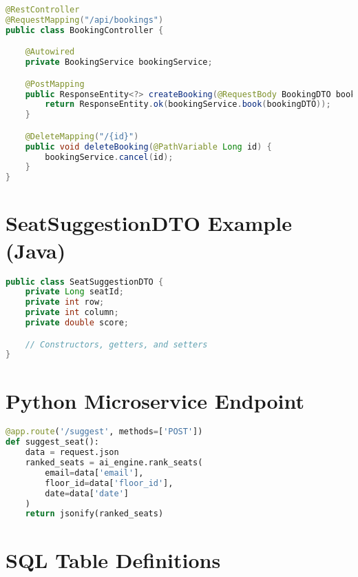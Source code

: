 \documentclass[12pt,a4paper]{report}
\begin{document}
\begin{lstlisting}[language=Java, caption=Booking Controller (Java), label=lst:booking-controller]
@RestController
@RequestMapping("/api/bookings")
public class BookingController {

    @Autowired
    private BookingService bookingService;

    @PostMapping
    public ResponseEntity<?> createBooking(@RequestBody BookingDTO bookingDTO) {
        return ResponseEntity.ok(bookingService.book(bookingDTO));
    }

    @DeleteMapping("/{id}")
    public void deleteBooking(@PathVariable Long id) {
        bookingService.cancel(id);
    }
}
\end{lstlisting}

\chapter{SeatSuggestionDTO Example (Java)}
\label{appendix:seatdto}

\begin{lstlisting}[language=Java, caption=SeatSuggestionDTO (Java), label=lst:seat-suggestion-dto]
public class SeatSuggestionDTO {
    private Long seatId;
    private int row;
    private int column;
    private double score;

    // Constructors, getters, and setters
}
\end{lstlisting}

\chapter{Python Microservice Endpoint}
\label{appendix:microservice}

\begin{lstlisting}[language=Python, caption=Seat Suggestion Endpoint (Flask), label=lst:python-endpoint]
@app.route('/suggest', methods=['POST'])
def suggest_seat():
    data = request.json
    ranked_seats = ai_engine.rank_seats(
        email=data['email'],
        floor_id=data['floor_id'],
        date=data['date']
    )
    return jsonify(ranked_seats)
\end{lstlisting}

\chapter{SQL Table Definitions}
\label{appendix:sql}
\end{document}
